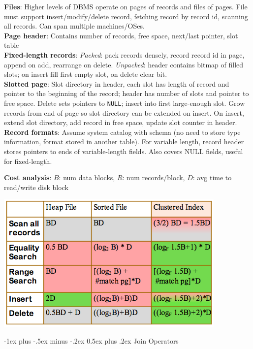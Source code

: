 \documentclass[10pt,landscape]{article}
\makeatletter
\renewcommand{\section}{\@startsection{section}{1}{0mm}%
                                {-1ex plus -.5ex minus -.2ex}%
                                {0.5ex plus .2ex}%
                                {\normalfont\large\bfseries}}
\makeatother
\begin{document}
\begin{multicols}{3}
\textbf{Files}: Higher levels of DBMS operate on pages of records and files of pages. File must support insert/modify/delete record, fetching record by record id, scanning all records. Can span multiple machines/OSes. \\
\textbf{Page header}: Contains number of records, free space, next/last pointer, slot table \\
\textbf{Fixed-length records}: \textit{Packed}: pack records densely, record record id in page, append on add, rearrange on delete. \textit{Unpacked}: header contains bitmap of filled slots; on insert fill first empty slot, on delete clear bit. \\
\textbf{Slotted page}: Slot directory in header, each slot has length of record and pointer to the beginning of the record; header has number of slots and pointer to free space. Delete sets pointers to \texttt{NULL}; insert into first large-enough slot. Grow records from end of page so slot directory can be extended on insert. On insert, extend slot directory, add record in free space, update slot counter in header. \\
\textbf{Record formats}: Assume system catalog with schema (no need to store type information, format stored in another table). For variable length, record header stores pointers to ends of variable-length fields. Also covers NULL fields, useful for fixed-length.

\textbf{Cost analysis}: $B$: num data blocks, $R$: num records/block, $D$: avg time to read/write disk block

\includegraphics[width=.9\linewidth]{costops.png}


\section{Join Operators}


\end{multicols}
\end{document}
